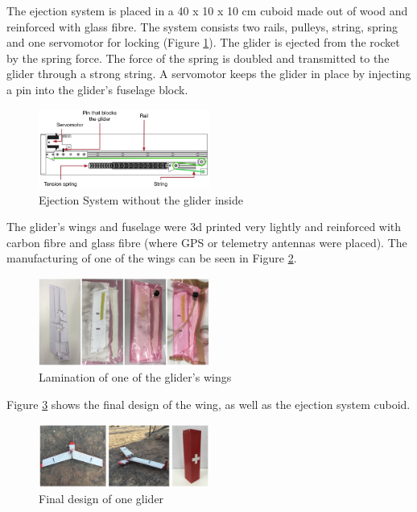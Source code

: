 The ejection system is placed in a 40 x 10 x 10 cm  cuboid made out of wood and reinforced with glass fibre. The system consists two rails, pulleys, string, spring and one servomotor for locking (Figure \ref{fig:ejection}). The glider is ejected from the rocket by the spring force. The force of the spring is doubled and transmitted to the glider through a strong string. A servomotor keeps the glider in place by injecting a pin into the glider's fuselage block.

\begin{figure}[h!]
    \centering
        \includegraphics[width=0.5\textwidth]{img/ejection_system.JPG}
        \caption{Ejection System without the glider inside}
        \label{fig:ejection}
 \end{figure}

The glider's wings and fuselage were 3d printed very lightly and reinforced with carbon fibre and glass fibre (where GPS or telemetry antennas were placed). The manufacturing of one of the wings can be seen in Figure \ref{fig:manufact}.

\begin{figure}[h!]
    \centering
        \includegraphics[width=0.5\textwidth]{img/manuf.png}
        \caption{Lamination of one of the glider's wings}
        \label{fig:manufact}
 \end{figure}


Figure \ref{fig:final} shows the final design of the wing, as well as the ejection system cuboid.



\begin{figure}[h!]
    \centering
        \includegraphics[width=0.5\textwidth]{img/final.png}
        \caption{Final design of one glider}
        \label{fig:final}
 \end{figure}

